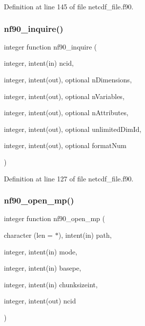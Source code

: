 Definition at line 145 of file netcdf\+\_\+file.\+f90.

\mbox{\label{netcdf__file_8f90_a60932835dd9715d8f50025ed2ff40fec}} 
\subsubsection{\texorpdfstring{nf90\+\_\+inquire()}{nf90\_inquire()}}
{\footnotesize\ttfamily integer function nf90\+\_\+inquire (\begin{DoxyParamCaption}\item[{integer, intent(in)}]{ncid,  }\item[{integer, intent(out), optional}]{n\+Dimensions,  }\item[{integer, intent(out), optional}]{n\+Variables,  }\item[{integer, intent(out), optional}]{n\+Attributes,  }\item[{integer, intent(out), optional}]{unlimited\+Dim\+Id,  }\item[{integer, intent(out), optional}]{format\+Num }\end{DoxyParamCaption})}



Definition at line 127 of file netcdf\+\_\+file.\+f90.

\mbox{\label{netcdf__file_8f90_a6d4993d0bc8de0c617071f6527f7dedf}} 
\subsubsection{\texorpdfstring{nf90\+\_\+open\+\_\+mp()}{nf90\_open\_mp()}}
{\footnotesize\ttfamily integer function nf90\+\_\+open\+\_\+mp (\begin{DoxyParamCaption}\item[{character (len = $\ast$), intent(in)}]{path,  }\item[{integer, intent(in)}]{mode,  }\item[{integer, intent(in)}]{basepe,  }\item[{integer, intent(in)}]{chunksizeint,  }\item[{integer, intent(out)}]{ncid }\end{DoxyParamCaption})}



